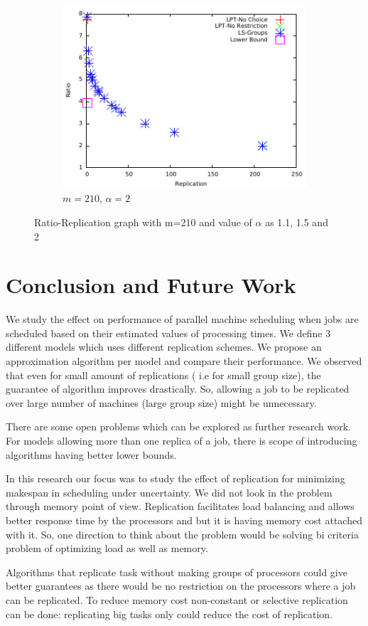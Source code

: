 \documentclass[10pt, conference, compsocconf]{IEEEtran}
\begin{document}
\begin {figure}
  \begin{subfigure}[b]{0.5\textwidth}
    \includegraphics[width=\textwidth]{alpha_2.pdf}
    \caption{$m=210$, $\alpha=2$}
    \label{fig:3}
  \end{subfigure} %

  
  \caption{Ratio-Replication graph with m=210 and value of $\alpha$ as 1.1, 1.5 and 2}
  \label{fig:Graph}
\end{figure}

\section{Conclusion and Future Work}\label{sec8}

We study the effect on performance of parallel machine scheduling when
jobs are scheduled based on their estimated values of processing
times.  We define 3 different models which uses different replication
schemes.  We propose an approximation algorithm per model and compare
their performance. We observed that even for small amount of
replications ( i.e for small group size), the guarantee of algorithm
improves drastically. So, allowing a job to be replicated over large
number of machines (large group size) might be unnecessary.

There are some open problems which can be explored as further research
work. For models allowing more than one replica of a job, there is
scope of introducing algorithms having better lower bounds.

In this research our focus was to study the effect of replication for
minimizing makespan in scheduling under uncertainty. We did not look
in the problem through memory point of view. Replication facilitates
load balancing and allows better response time by the processors and
but it is having memory cost attached with it. So, one direction to
think about the problem would be solving bi criteria problem of
optimizing load as well as memory.
 
Algorithms that replicate task without making groups of processors
could give better guarantees as there would be no restriction on the
processors where a job can be replicated. To reduce memory cost
non-constant or selective replication can be done: replicating big
tasks only could reduce the cost of replication.



 
\end{document}
